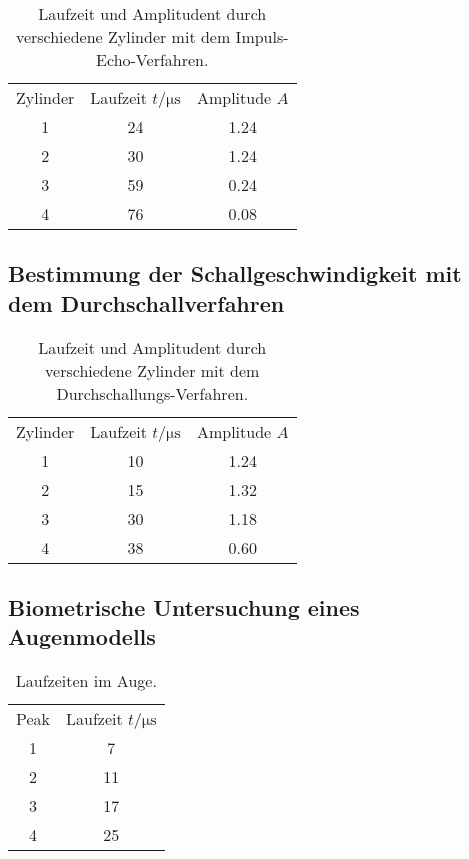 \begin{table}[H]
  \centering
  \caption{Laufzeit und Amplitudent durch verschiedene Zylinder mit dem Impuls-Echo-Verfahren.}
  \label{tab:tAimpE}
  \begin{tabular}{S[table-format=1.0] S[table-format=2.0] S[table-format=1.2] }
  \toprule
  {Zylinder} & {Laufzeit $t / \si{\micro\second}$} &  {Amplitude $A$}\\
  1 &  24  & 1.24  \\
  2 &  30  & 1.24  \\
  3 &  59  & 0.24  \\
  4 &  76  & 0.08  \\
  \bottomrule
  \end{tabular}
\end{table}

\subsection{Bestimmung der Schallgeschwindigkeit mit dem Durchschallverfahren}
\label{subsec:SchallDurchV}

\begin{table}[H]
  \centering
  \caption{Laufzeit und Amplitudent durch verschiedene Zylinder mit dem Durchschallungs-Verfahren.}
  \label{tab:tADurch}
  \begin{tabular}{S[table-format=1.0] S[table-format=2.0] S[table-format=1.2] }
  \toprule
  {Zylinder} & {Laufzeit $t / \si{\micro\second}$} &  {Amplitude $A$}\\
  1 &  10  & 1.24  \\
  2 &  15  & 1.32  \\
  3 &  30  & 1.18  \\
  4 &  38  & 0.60  \\
  \bottomrule
  \end{tabular}
\end{table}

\subsection{Biometrische Untersuchung eines Augenmodells}
\label{subsec:Augew}

\begin{table}[H]
  \centering
  \caption{Laufzeiten im Auge.}
  \label{tab:Auge}
  \begin{tabular}{S[table-format=1.0] S[table-format=2.0] }
  \toprule
  {Peak} & {Laufzeit $t / \si{\micro\second}$} \\
  1 &  7 \\
  2 &  11 \\
  3 &  17 \\
  4 &  25 \\
  \bottomrule
  \end{tabular}
\end{table}